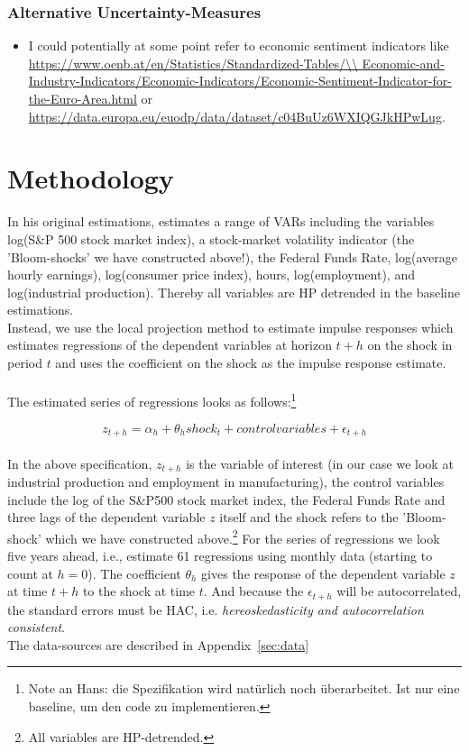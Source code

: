 \documentclass[a4paper,12pt,oneside,pointednumbers,numbers=noenddot,bibtotoc,bigheadings,liststotoc,chapterprefix=true]{scrbook}
\begin{document}
\subsection{Alternative Uncertainty-Measures}
\begin{itemize}
	\item I could potentially at some point refer to economic sentiment indicators like \url{https://www.oenb.at/en/Statistics/Standardized-Tables/\\
	Economic-and-Industry-Indicators/Economic-Indicators/Economic-Sentiment-Indicator-for-the-Euro-Area.html} or \url{https://data.europa.eu/euodp/data/dataset/c04BuUz6WXIQGJkHPwLug}.
\end{itemize}


\chapter{Methodology}
In his original estimations, \citet{bloom:09} estimates a range of VARs including the variables log(S\&P 500 stock market index), a stock-market volatility indicator (the 'Bloom-shocks' we have constructed above!), the Federal Funds Rate, log(average hourly earnings), log(consumer price index), hours, log(employment), and log(industrial production). Thereby all variables are HP detrended in the baseline estimations.\\
Instead, we use the \citet{jorda:05} local projection method to estimate impulse responses which estimates regressions of the dependent variables at horizon $t+h$ on the shock in period $t$ and uses the coefficient on the shock as the impulse response estimate.
\\
\\
The estimated series of regressions looks as follows:\footnote{Note an Hans: die Spezifikation wird natürlich noch überarbeitet. Ist nur eine baseline, um den code zu implementieren.}

\begin{equation} \label{eq:2.1}
z_{t+h} = \alpha_h + \theta_h shock_t + control variables + \epsilon_{t+h}
\end{equation}\\

In the above specification, $z_{t+h}$ is the variable of interest (in our case we look at industrial production and employment in manufacturing), the control variables include the log of the S\&P500 stock market index, the Federal Funds Rate and three lags of the dependent variable $z$ itself and the shock refers to the 'Bloom-shock' which we have constructed above.\footnote{All variables are HP-detrended.} For the series of regressions we look five years ahead, i.e., estimate 61 regressions using monthly data (starting to count at $h=0$). The coefficient $\theta_h$ gives the response of the dependent variable $z$ at time $t+h$ to the shock at time $t$. And because the $\epsilon_{t+h}$ will be autocorrelated, the standard errors must be HAC, i.e. \textit{hereoskedasticity and autocorrelation consistent}.\\
The data-sources are described in Appendix~\ref{sec:data}
\end{document}
